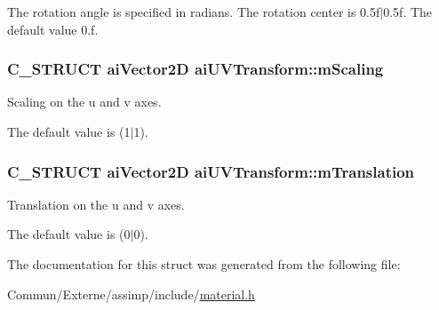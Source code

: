 The rotation angle is specified in radians. The rotation center is 0.\+5f$\vert$0.5f. The default value 0.\+f. 
\subsubsection[{\texorpdfstring{m\+Scaling}{mScaling}}]{\setlength{\rightskip}{0pt plus 5cm}C\+\_\+\+S\+T\+R\+U\+CT {\bf ai\+Vector2D} ai\+U\+V\+Transform\+::m\+Scaling}\hypertarget{structai_u_v_transform_a89429a027cbf914e7212e48149a957c8}{}\label{structai_u_v_transform_a89429a027cbf914e7212e48149a957c8}
Scaling on the u and v axes.

The default value is (1$\vert$1). 
\subsubsection[{\texorpdfstring{m\+Translation}{mTranslation}}]{\setlength{\rightskip}{0pt plus 5cm}C\+\_\+\+S\+T\+R\+U\+CT {\bf ai\+Vector2D} ai\+U\+V\+Transform\+::m\+Translation}\hypertarget{structai_u_v_transform_a8c7f35959aa342bf0cef670246fbb813}{}\label{structai_u_v_transform_a8c7f35959aa342bf0cef670246fbb813}
Translation on the u and v axes.

The default value is (0$\vert$0). 

The documentation for this struct was generated from the following file\+:\begin{DoxyCompactItemize}
\item 
Commun/\+Externe/assimp/include/\hyperlink{material_8h}{material.\+h}\end{DoxyCompactItemize}
